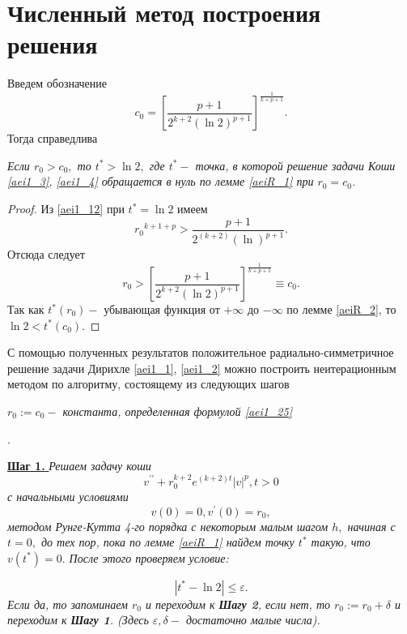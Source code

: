 \section{ Численный метод построения решения}
Введем обозначение
\begin{equation}\label{aei1_25}
c_0=\left [\frac{p+1}{2^{k+2}(\ln2)^{p+1}}\right ]^{\frac{1}{k+p+1}}.
\end{equation}
Тогда справедлива

 \begin{lemma}\label{aeiR_3}
 \textit{ Если $ r_0> c_0, $ то $ t^* >\ln2,$ где $ t^* -$ точка, в которой  решение задачи Коши \eqref{aei1_3}, \eqref{aei1_4} обращается в нуль по лемме \ref{aeiR_1} при $ r_0=c_0 $. }
 \end{lemma}

\begin{proof}
Из  \eqref{aei1_12} при $ t^*=\ln2 $ имеем
$$
{r_0}^{k+1+p} >\frac{p+1}{2^{(k+2)} (\ln)^{p+1}}.
$$
Отсюда следует
$$
r_0>\left [\frac{p+1}{2^{k+2}(\ln2)^{p+1}}\right ]^{\frac{1}{k+p+1}}\equiv c_0.
$$
Так как $t^*(r_0) -$ убывающая функция от $+\infty $ до $-\infty$ по лемме \ref{aeiR_2}, то $ \ln2 < t^*(c_0)$.

\end{proof}

С помощью полученных результатов положительное радиально-симметричное решение задачи Дирихле \eqref{aei1_1}, \eqref{aei1_2} можно построить неитерационным методом по алгоритму, состоящему из следующих шагов
\bigskip

\centerline\textit{ $ r_0:=c_0- $ константа, определенная формулой \eqref{aei1_25}}.

\underline{\textbf{ Шаг 1. }}
\textit{ Решаем задачу коши
\begin{equation*} %
v^{\prime\prime}+r_0^{k+2}e^{(k+2)t} {\vert v \vert}^p,t>0
\end{equation*}
 с начальными условиями
\begin{equation*} %
v(0)=0, v^{\prime}(0)=r_0,
\end{equation*}
методом Рунге-Кутта 4-го порядка с некоторым малым шагом $ h,$ начиная с $ t=0,$ до тех пор, пока по лемме \ref{aeiR_1} найдем точку $ t^*$ такую, что $ v(t^*)=0.$  После этого проверяем условие:}

$$
|t^*-\ln2| \leq\varepsilon.
$$
\textit{Если да, то  запоминаем $ r_0 $ и переходим к \textbf{ Шагу 2}, если нет, то $ r_0:=r_0+\delta$ и переходим к \textbf{ Шагу 1}.  (Здесь $\varepsilon, \delta - $ достаточно малые числа). }

